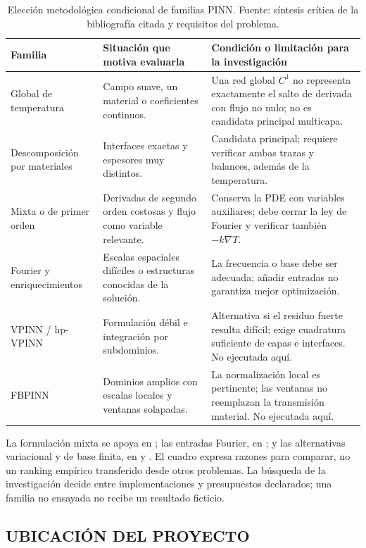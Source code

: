 \begin{table}[htbp]
\centering
\caption{Elección metodológica condicional de familias PINN. Fuente: síntesis crítica de la bibliografía citada y requisitos del problema.}
\label{tab:familias-pinn}
\begin{tabularx}{\textwidth}{L{2.6cm}Y Y}
\toprule
Familia & Situación que motiva evaluarla & Condición o limitación para la investigación \\
\midrule
Global de temperatura & Campo suave, un material o coeficientes continuos. & Una red global $C^1$ no representa exactamente el salto de derivada con flujo no nulo; no es candidata principal multicapa. \\
Descomposición por materiales & Interfaces exactas y espesores muy distintos. & Candidata principal; requiere verificar ambas trazas y balances, además de la temperatura. \\
Mixta o de primer orden & Derivadas de segundo orden costosas y flujo como variable relevante. & Conserva la PDE con variables auxiliares; debe cerrar la ley de Fourier y verificar también $-k\nabla T$. \\
Fourier y enriquecimientos & Escalas espaciales difíciles o estructuras conocidas de la solución. & La frecuencia o base debe ser adecuada; añadir entradas no garantiza mejor optimización. \\
VPINN / hp-VPINN & Formulación débil e integración por subdominios. & Alternativa si el residuo fuerte resulta difícil; exige cuadratura suficiente de capas e interfaces. No ejecutada aquí. \\
FBPINN & Dominios amplios con escalas locales y ventanas solapadas. & La normalización local es pertinente; las ventanas no reemplazan la transmisión material. No ejecutada aquí. \\
\bottomrule
\end{tabularx}
\end{table}

La formulación mixta se apoya en \textcite{gladstone2022fopinn}; las entradas Fourier, en \textcite{wang2020fourier}; y las alternativas variacional y de base finita, en \textcite{kharazmi2020hpvpinn} y \textcite{moseley2021fbpinn}. El cuadro expresa razones para comparar, no un ranking empírico transferido desde otros problemas. La búsqueda de la investigación decide entre implementaciones y presupuestos declarados; una familia no ensayada no recibe un resultado ficticio.

\subsection{UBICACIÓN DEL PROYECTO}

